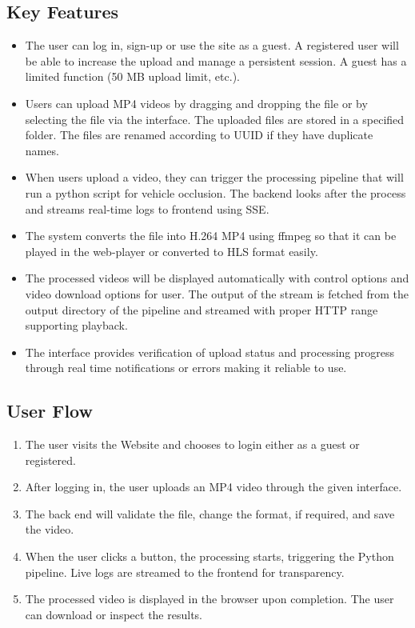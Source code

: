 \documentclass[12pt,a4paper]{report}
\theoremstyle{definition}
\theoremstyle{remark}
\begin{document}
\subsection{Key Features}
\begin{itemize}
    \item The user can log in, sign-up or use the site as a guest. A registered user will be able to increase the upload and manage a persistent session. A guest has a limited function (50 MB upload limit, etc.).
    \item Users can upload MP4 videos by dragging and dropping the file or by selecting the file via the interface. The uploaded files are stored in a specified folder. The files are renamed according to UUID if they have duplicate names.
    \item When users upload a video, they can trigger the processing pipeline that will run a python script for vehicle occlusion. The backend looks after the process and streams real-time logs to frontend using SSE.
    \item The system converts the file into H.264 MP4 using ffmpeg so that it can be played in the web-player or converted to HLS format easily.
    \item The processed videos will be displayed automatically with control options and video download options for user. The output of the stream is fetched from the output directory of the pipeline and streamed with proper HTTP range supporting playback.
    \item The interface provides verification of upload status and processing progress through real time notifications or errors making it reliable to use.
\end{itemize}

\subsection{User Flow}
\begin{enumerate}
    \item The user visits the Website and chooses to login either as a guest or registered.
    \item After logging in, the user uploads an MP4 video through the given interface.
    \item The back end will validate the file, change the format, if required, and save the video.
    \item When the user clicks a button, the processing starts, triggering the Python pipeline. Live logs are streamed to the frontend for transparency.
    \item The processed video is displayed in the browser upon completion. The user can download or inspect the results.
\end{enumerate}
\end{document}
